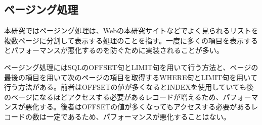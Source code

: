 \documentclass[../../../main]{subfiles}
\begin{document}
    \subsection{ページング処理}\label{subsec:phraseology-paging_pagination}

    本研究ではページング処理は、Webの本研究サイトなどでよく見られるリストを複数ページに分割して表示する処理のことを指す。一度に多くの項目を表示するとパフォーマンスが悪化するのを防ぐために実装されることが多い。

    ページング処理にはSQLのOFFSET句とLIMIT句を用いて行う方法と、ページの最後の項目を用いて次のページの項目を取得するWHERE句とLIMIT句を用いて行う方法がある。前者はOFFSETの値が多くなるとINDEXを使用していても後のページになるほどアクセスする必要があるレコードが増えるため、パフォーマンスが悪化する。後者はOFFSETの値が多くなってもアクセスする必要があるレコードの数は一定であるため、パフォーマンスが悪化することはない。
\end{document}
